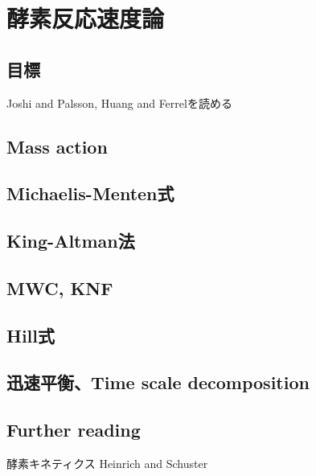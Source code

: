 \chapter{酵素反応速度論}
\section{目標}
Joshi and Palsson, Huang and Ferrelを読める
\section{Mass action}
\section{Michaelis-Menten式}
\section{King-Altman法}
\section{MWC, KNF}
\section{Hill式}
\section{迅速平衡、Time scale decomposition}
\section{Further reading}
酵素キネティクス
Heinrich and Schuster





